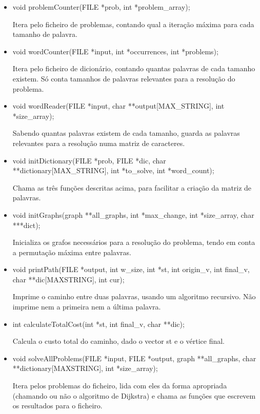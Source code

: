 \documentclass[a4paper, 11pt]{article}
\begin{document}
    \begin{itemize}
    \item void problemCounter(FILE *prob, int *problem{\_}array);
    \par Itera pelo ficheiro de problemas, contando qual a iteração máxima para cada tamanho de palavra.
    
    \item void wordCounter(FILE *input, int *occurrences, int *problems);
    \par Itera pelo ficheiro de dicionário, contando quantas palavras de cada tamanho existem. Só conta tamanhos de palavras relevantes para a resolução do problema.
    
    \item void wordReader(FILE *input, char **output[MAX{\_}STRING], int *size{\_}array);
    \par Sabendo quantas palavras existem de cada tamanho, guarda as palavras relevantes para a resolução numa matriz de caracteres.
    
    \item void initDictionary(FILE *prob, FILE *dic, char **dictionary[MAX{\_}STRING], int *to{\_}solve, int *word{\_}count);
    \par Chama as três funções descritas acima, para facilitar a criação da matriz de palavras.
    
    \item void initGraphs(graph **all{\_}graphs, int *max{\_}change, int *size{\_}array, char ***dict);
    \par Inicializa os grafos necessários para a resolução do problema, tendo em conta a permutação máxima entre palavras.
    
    \item void printPath(FILE *output, int w{\_}size, int *st, int origin{\_}v, int final{\_}v, char **dic[MAX\-{\_}STRING], int cur);
    \par Imprime o caminho entre duas palavras, usando um algoritmo recursivo. Não imprime nem a primeira nem a última palavra.
    
    \item int calculateTotalCost(int *st, int final{\_}v, char **dic);
    \par Calcula o custo total do caminho, dado o vector st e o vértice final.
    
    \item void solveAllProblems(FILE *input, FILE *output, graph **all{\_}graphs, char **dictionary[MAX\-{\_}STRING], int *size{\_}array);
    \par  Itera pelos problemas do ficheiro, lida com eles da forma apropriada (chamando ou não o algoritmo de Dijkstra) e chama as funções que escrevem os resultados para o ficheiro.
    

\end{itemize}
\end{document}
